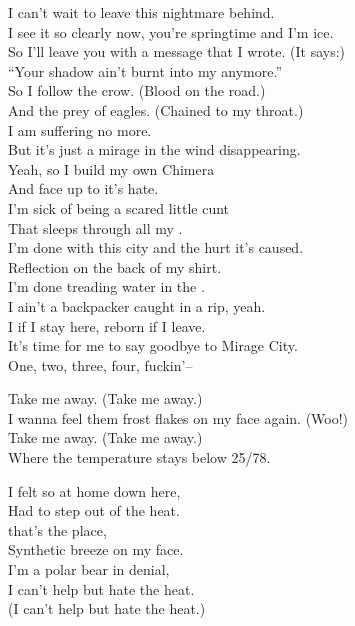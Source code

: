 
I can't wait to leave this nightmare behind. \\
I see it so clearly now, you're springtime and I'm ice. \\
So I'll leave you with a message that I wrote. (It says:) \\
``Your shadow ain't burnt into my  anymore.'' \\

So I follow the crow. (Blood on the road.) \\
And the prey of eagles. (Chained to my throat.) \\
I am suffering no more. \\
But it's just a mirage in the wind disappearing. \\

Yeah, so I build my own Chimera \\
And face up to it's hate. \\
I'm sick of being a scared little cunt \\
That sleeps through all my . \\
I'm done with this city and the hurt it's caused. \\

Reflection on the back of my shirt. \\
I'm done treading water in the . \\
I ain't a backpacker caught in a rip, yeah. \\
I  if I stay here, reborn if I leave. \\
It's time for me to say goodbye to Mirage City. \\

One, two, three, four, fuckin'--




Take me away. (Take me away.) \\
I wanna feel them frost flakes on my face again. (Woo!) \\
Take me away. (Take me away.) \\
Where the temperature stays below 25/78. \\


I felt so at home down here, \\
Had to step out of the heat. \\
 that's the place, \\
Synthetic breeze on my face. \\
I'm a polar bear in denial, \\
I can't help but hate the heat. \\
(I can't help but hate the heat.) \\

